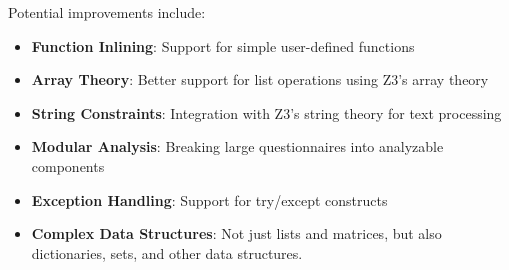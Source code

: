 Potential improvements include:

\begin{itemize}
    \item \textbf{Function Inlining}: Support for simple user-defined functions
    \item \textbf{Array Theory}: Better support for list operations using Z3's array theory
    \item \textbf{String Constraints}: Integration with Z3's string theory for text processing
    \item \textbf{Modular Analysis}: Breaking large questionnaires into analyzable components
    \item \textbf{Exception Handling}: Support for try/except constructs
    \item \textbf{Complex Data Structures}: Not just lists and matrices, but also dictionaries, sets, and other data structures.
\end{itemize}
